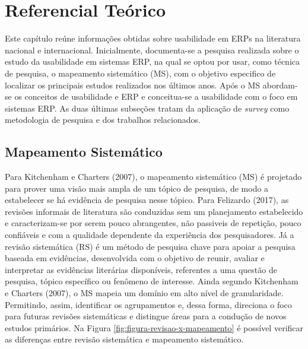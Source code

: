 \chapter{Referencial Teórico} \label{Referencial Teórico}

Este capítulo reúne informações obtidas sobre usabilidade em ERPs na literatura nacional e internacional. Inicialmente, documenta-se a pesquisa realizada sobre o estudo da usabilidade em sistemas ERP, na qual se optou por usar, como técnica de pesquisa, o mapeamento sistemático (MS), com o objetivo especifico de localizar os principais estudos realizados nos últimos anos. Após o MS abordam-se os conceitos de usabilidade e ERP e conceitua-se a usabilidade com o foco em sistemas ERP. As duas últimas subseções tratam da aplicação de \textit{survey} como metodologia de pesquisa e dos trabalhos relacionados. 


\section{Mapeamento Sistemático} \label{Mapeamento Sistemático}

Para Kitchenham e Charters (2007), o mapeamento sistemático (MS) é projetado para prover uma visão mais ampla de um tópico de pesquisa, de modo a estabelecer se há evidência de pesquisa nesse tópico.\newline
\indent Para Felizardo (2017), as revisões informais de literatura são conduzidas sem um planejamento estabelecido e caracterizam-se por serem pouco abrangentes, não passiveis de repetição, pouco confiáveis e com a qualidade dependente da experiência dos pesquisadores. Já a revisão sistemática (RS) é um método de pesquisa chave para apoiar a pesquisa baseada em evidências, desenvolvida com o objetivo de reunir, avaliar e interpretar as evidências literárias disponíveis, referentes a uma questão de pesquisa, tópico específico ou fenômeno de interesse.\newline
\indent Ainda segundo Kitchenham e Charters (2007), o MS mapeia um domínio em alto nível de granularidade. Permitindo, assim, identificar os agrupamentos e, dessa forma, direciona o foco para futuras revisões sistemáticas e distingue áreas para a condução de novos estudos primários.\newline
\indent Na Figura \ref{fig:figura-revisao-x-mapeamento} é possível verificar as diferenças entre revisão sistemática e mapeamento sistemático.

